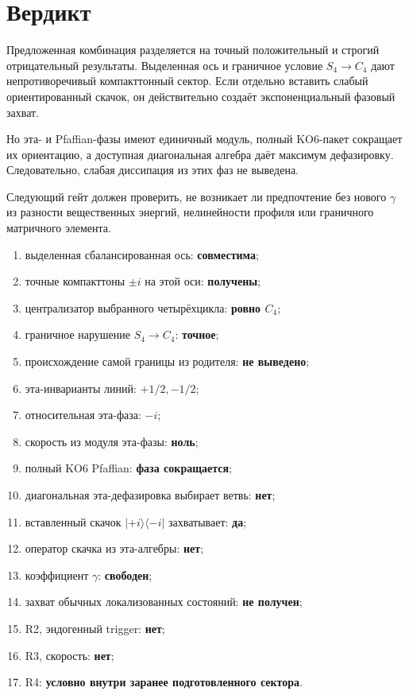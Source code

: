 \section{Вердикт}

Предложенная комбинация разделяется на точный положительный и строгий
отрицательный результаты. Выделенная ось и граничное условие
$S_4\to C_4$ дают непротиворечивый компакттонный сектор. Если отдельно
вставить слабый ориентированный скачок, он действительно создаёт
экспоненциальный фазовый захват.

Но эта- и Pfaffian-фазы имеют единичный модуль, полный KO6-пакет сокращает
их ориентацию, а доступная диагональная алгебра даёт максимум
дефазировку. Следовательно, слабая диссипация из этих фаз не выведена.

Следующий гейт
должен проверить, не возникает ли предпочтение без нового $\gamma$ из
разности вещественных энергий, нелинейности профиля или граничного
матричного элемента.

\begin{protocol}
\begin{enumerate}
 \item выделенная сбалансированная ось: \textbf{совместима};
 \item точные компакттоны $\pm i$ на этой оси: \textbf{получены};
 \item централизатор выбранного четырёхцикла: \textbf{ровно $C_4$};
 \item граничное нарушение $S_4\to C_4$: \textbf{точное};
 \item происхождение самой границы из родителя: \textbf{не выведено};
 \item эта-инварианты линий: \textbf{$+1/2,-1/2$};
 \item относительная эта-фаза: \textbf{$-i$};
 \item скорость из модуля эта-фазы: \textbf{ноль};
 \item полный KO6 Pfaffian: \textbf{фаза сокращается};
 \item диагональная эта-дефазировка выбирает ветвь: \textbf{нет};
 \item вставленный скачок $|+i\rangle\langle-i|$ захватывает:
 \textbf{да};
 \item оператор скачка из эта-алгебры: \textbf{нет};
 \item коэффициент $\gamma$: \textbf{свободен};
 \item захват обычных локализованных состояний: \textbf{не получен};
 \item R2, эндогенный trigger: \textbf{нет};
 \item R3, скорость: \textbf{нет};
 \item R4: \textbf{условно внутри заранее подготовленного сектора}.
\end{enumerate}
\end{protocol}

